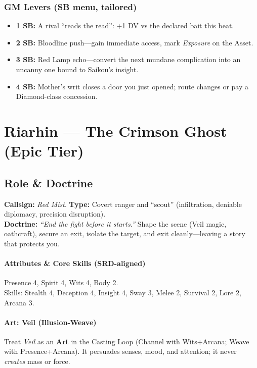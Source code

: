 \subsubsection{GM Levers (SB menu, tailored)}
\begin{itemize}
  \item \textbf{1 SB:} A rival ``reads the read'': +1 DV vs the declared bait this beat.
  \item \textbf{2 SB:} Bloodline push---gain immediate access, mark \emph{Exposure} on the Asset.
  \item \textbf{3 SB:} Red Lamp echo---convert the next mundane complication into an uncanny one bound to Saikou's insight.
  \item \textbf{4 SB:} Mother's writ closes a door you just opened; route changes or pay a Diamond-class concession.
\end{itemize}

\section{Riarhin --- The Crimson Ghost (Epic Tier)}

\subsection{Role \& Doctrine}
\textbf{Callsign:} \emph{Red Mist}. \quad
\textbf{Type:} Covert ranger and ``scout'' (infiltration, deniable diplomacy, precision disruption). \\
\textbf{Doctrine:} \emph{``End the fight before it starts.''} Shape the scene (Veil magic, oathcraft), secure  an exit, isolate the target, and exit cleanly---leaving a story that protects you.

\paragraph{Attributes \& Core Skills (SRD-aligned)}
Presence 4, Spirit 4, Wits 4, Body 2. \\
Skills: Stealth 4, Deception 4, Insight 4, Sway 3, Melee 2, Survival 2, Lore 2, Arcana 3.

\paragraph{Art: Veil (Illusion-Weave)}
Treat \emph{Veil} as an \textbf{Art} in the Casting Loop (Channel with Wits+Arcana; Weave with Presence+Arcana). It persuades senses, mood, and attention; it never \emph{creates} mass or force.

